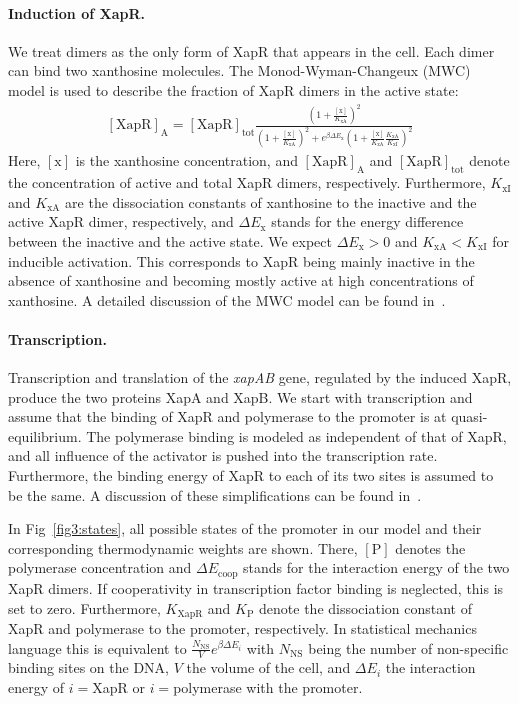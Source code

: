 \documentclass[10pt,letterpaper]{article}
\newcommand{\n}[1]{\mathrm{#1}}
\begin{document}
\paragraph*{Induction of XapR.} 
We treat dimers as the only form of XapR that appears in the cell. Each
dimer can bind two xanthosine molecules. The Monod-Wyman-Changeux (MWC)
model is used to describe the fraction of XapR dimers in the active state: 
\begin{eqnarray}
\label{eq:MWC}
\n{[XapR]_A} = \n{[XapR]_{tot}} \frac{\left(1 + \frac{\n{[x]}}{K_{\n{xA}}}\right)^2}{\left(1 + \frac{\n{[x]}}{K_{\n{xA}}}\right)^2 + e^{\beta \Delta E_{\n{x}}} \left(1+\frac{\n{[x]}}{K_{\n{xA}}} \frac{K_{\n{xA}}}{K_{\n{xI}}}\right)^2}
\end{eqnarray}
Here, $\n{[x]}$ is the xanthosine concentration, and $\n{[XapR]_A}$ and
$\n{[XapR]_{tot}}$ denote the concentration of active and total XapR dimers,
respectively. Furthermore, $K_{\n{xI}}$ and $K_{\n{xA}}$ are the
dissociation constants of xanthosine to the inactive and the active XapR
dimer, respectively, and $\Delta E_{\n{x}}$ stands for the energy difference
between the inactive and the active state. We expect $\Delta E_{\n{x}} > 0$
and $K_{\n{xA}} < K_{\n{xI}}$ for inducible activation. This corresponds to
XapR being mainly inactive in the absence of xanthosine and becoming mostly
active at high concentrations of xanthosine. A detailed discussion of the
MWC model can be found in~\cite{Marzen2013}.

\paragraph*{Transcription.} 
Transcription and translation of the \emph{xapAB} gene, regulated by the
induced XapR, produce the two proteins XapA and XapB. We start with
transcription and assume that the binding of XapR and polymerase to the
promoter is at quasi-equilibrium. The polymerase binding is modeled as
independent of that of XapR, and all influence of the activator is pushed
into the transcription rate. Furthermore, the binding energy of XapR to each
of its two sites is assumed to be the same. A discussion of these
simplifications can be found in~.

In Fig~\ref{fig3:states}, all possible states of the promoter in our model
and their corresponding thermodynamic weights are shown. There, $\n{[P]}$
denotes the polymerase concentration and $\Delta E_{\n{coop}}$ stands for
the interaction energy of the two XapR dimers. If cooperativity in
transcription factor binding is neglected, this is set to zero. Furthermore,
$K_{\n{XapR}}$ and $K_{\n{P}}$ denote the dissociation constant of XapR and
polymerase to the promoter, respectively. In statistical mechanics language
this is equivalent to $\frac{N_{\mathrm{NS}}}{V} e^{\beta \Delta E_{i}}$
with $N_{\mathrm{NS}}$ being the number of non-specific binding sites on the
DNA, $V$ the volume of the cell, and $\Delta E_{i}$ the interaction energy
of $i=$XapR or $i=$polymerase with the promoter.
\end{document}
